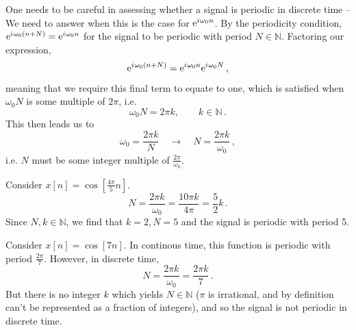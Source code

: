 %
One needs to be careful in assessing whether a signal is periodic in discrete time --
We need to answer when this is the case for $\mathrm{e}^{{i\mkern1mu}\omega_0 n}$. By
the periodicity condition, $\mathrm{e}^{{i\mkern1mu}\omega_0(n+N)} = \mathrm{e}^{{i\mkern1mu}\omega_0n}$ for the signal
to be periodic with period $N\in\mathbb{N}$. Factoring our expression,
%
\begin{displaymath}
  \mathrm{e}^{{i\mkern1mu}\omega_0(n+N)} = \mathrm{e}^{{i\mkern1mu}\omega_0n}\mathrm{e}^{{i\mkern1mu}\omega_0N} \,,
\end{displaymath}
%
meaning that we require this final term to equate to one, which is satisfied when $\omega_0N$
is some multiple of $2\pi$, i.e.
%
\begin{displaymath}
  \omega_0N = 2\pi k, \qquad k\in\mathbb{N} \,.
\end{displaymath}
%
This then leads us to
%
\begin{displaymath}
  \omega_0 = \frac{2\pi k}{N} \quad\rightarrow\quad N = \frac{2\pi k}{\omega_0} \,,
\end{displaymath}
%
i.e. $N$ must be some integer multiple of $\frac{2\pi}{\omega_0}$.
%
\begin{exmp}
  Consider $x[n] = \cos[\frac{4\pi}{5}n]$.
  \begin{displaymath}
    N = \frac{2\pi k}{\omega_0} = \frac{10\pi k}{4\pi} = \frac{5}{2}k \,.
  \end{displaymath}
  Since $N,k\in\mathbb{N}$, we find that $k=2, N=5$ and the signal is periodic with
  period 5.
\end{exmp}
\begin{exmp}
  Consider $x[n] = \cos[7n]$. In continous time, this function is periodic with period
  $\frac{2\pi}{7}$. However, in discrete time,
  \begin{displaymath}
    N = \frac{2\pi k}{\omega_0} = \frac{2\pi k}{7} \,.
  \end{displaymath}
  But there is no integer $k$ which yields $N\in\mathbb{N}$ ($\pi$ is irrational, and by
  definition can't be represented as a fraction of integers), and so the signal is not
  periodic in discrete time.
\end{exmp}


